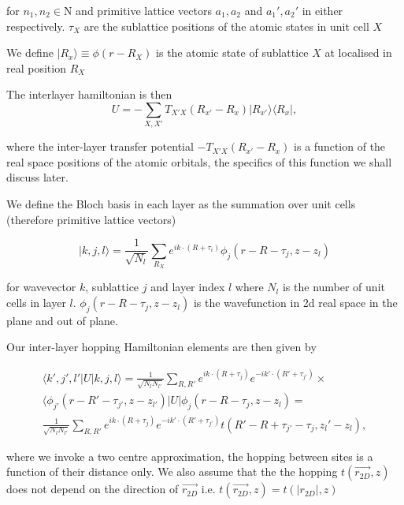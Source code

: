 \documentclass[10pt, twocolumn]{article} %
\begin{document}
  for $n_1, n_2 \in \mathrm{N}$ and primitive lattice vectors $a_1, a_2$ and $a_1', a_2'$ in either respectively. $\tau_X$ are the sublattice positions of the atomic states in unit cell $X$

  We define $| R_x \rangle \equiv \phi(r - R_X)$ is the atomic state of sublattice $X$ at localised in real position $R_X$

  The interlayer hamiltonian is then
  \begin{equation}
    U = -\sum_{X, X'} T_{X'X}(R_{x'} - R_x) |R_{x'}\rangle \langle R_x|,
    \label{inter-layer_hamiltonian_elements}
  \end{equation}

  where the inter-layer transfer potential $-T_{X'X}(R_{x'} - R_x)$ is a function of the real space positions of the atomic orbitals, the specifics of this function we shall discuss later.

  We define the Bloch basis in each layer as the summation over unit cells (therefore primitive lattice vectors)

  \begin{equation}
    | k,j,l \rangle = \frac{1}{\sqrt{N_l}}\sum_{R_X}e^{ik\cdot(R+\tau_i)}\phi_j(r-R-\tau_j, z-z_l)
    \label{inter-layer_real_bloch_basis}
  \end{equation}

  for wavevector $k$, sublattice $j$ and layer index $l$ where $N_l$ is the number of unit cells in layer $l$. $\phi_j (r - R - \tau_j, z-z_l)$ is the wavefunction in 2d real space in the plane and out of plane.

  Our inter-layer hopping Hamiltonian elements are then given by

  \begin{equation}
  \begin{gathered}
    \langle k',j',l' | U | k, j, l \rangle = \frac{1}{\sqrt{N_l N_{l'}}} \sum_{R, R'} e^{ik \cdot (R+\tau_j)} e^{-ik' \cdot (R' + \tau_{j'})} \times \\
    \langle \phi_{j'}(r - R' - \tau_{j'}, z - z_{l'}) | U | \phi_j (r - R - \tau_j, z - z_l) = \\
    \frac{1}{\sqrt{N_l N_{l'}}} \sum_{R, R'} e^{ik \cdot (R+\tau_j)} e^{-ik' \cdot (R' + \tau_{j'})} t(R'-R +\tau_{j'} - \tau_j, z_l' - z_l),
    \label{}
  \end{gathered}
  \end{equation}

  where we invoke a two centre approximation, the hopping between sites is a function of their distance only. We also assume that the the hopping $t(\vec{r_{2D}}, z)$ does not depend on the direction of $\vec{r_{2D}}$ i.e. $t(\vec{r_{2D}}, z) = t(|r_{2D}|, z)$
\end{document}
